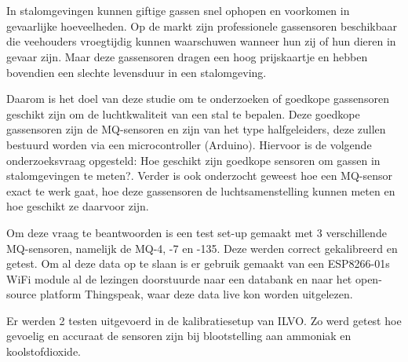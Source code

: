 
%
%
%
%
%




\chapter*{}


In stalomgevingen kunnen giftige gassen snel ophopen en voorkomen in gevaarlijke hoeveelheden. Op de markt zijn professionele gassensoren beschikbaar die veehouders vroegtijdig kunnen waarschuwen wanneer hun zij of hun dieren in gevaar zijn. Maar deze gassensoren dragen een hoog prijskaartje en hebben bovendien een slechte levensduur in een stalomgeving.

Daarom is het doel van deze studie om te onderzoeken of goedkope gassensoren geschikt zijn om de luchtkwaliteit van een stal te bepalen. Deze goedkope gassensoren zijn de MQ-sensoren en zijn van het type halfgeleiders, deze zullen bestuurd worden via een microcontroller (Arduino). Hiervoor is de volgende onderzoeksvraag opgesteld: Hoe geschikt zijn goedkope sensoren om gassen in stalomgevingen te meten?. Verder is ook onderzocht geweest hoe een MQ-sensor exact te werk gaat, hoe deze gassensoren de luchtsamenstelling kunnen meten en hoe geschikt ze daarvoor zijn.

Om deze vraag te beantwoorden is een test set-up gemaakt met 3 verschillende MQ-sensoren, namelijk de MQ-4, -7 en -135. Deze werden correct gekalibreerd en getest. Om al deze data op te slaan is er gebruik gemaakt van een ESP8266-01s WiFi module al de lezingen doorstuurde naar een databank en naar het open-source platform Thingspeak, waar deze data live kon worden uitgelezen.

Er werden 2 testen uitgevoerd in de kalibratiesetup van ILVO. Zo werd getest hoe gevoelig en accuraat de sensoren zijn bij blootstelling aan ammoniak en koolstofdioxide.









